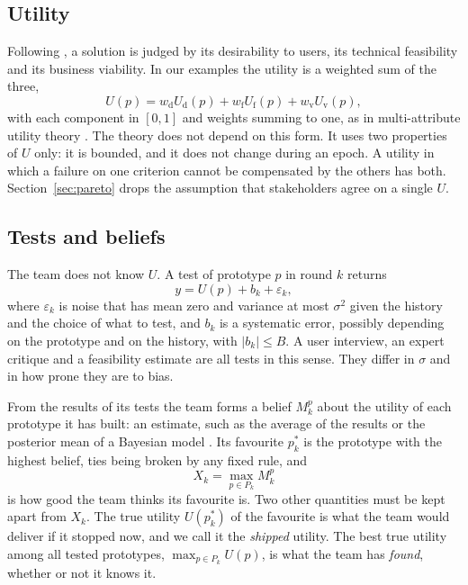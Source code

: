 \documentclass[10pt,twocolumn]{article}
\newcommand{\Pk}{P_k}
\theoremstyle{definition}
\begin{document}
\subsection{Utility}

Following \citet{brown2009}, a solution is judged by its desirability to users, its technical feasibility and its business viability. In our examples the utility is a weighted sum of the three,
\begin{equation}
\label{eq:utility}
U(p)=w_{\mathrm d}U_{\mathrm d}(p)+w_{\mathrm f}U_{\mathrm f}(p)+w_{\mathrm v}U_{\mathrm v}(p),
\end{equation}
with each component in $[0,1]$ and weights summing to one, as in multi-attribute utility theory \citep{keeney1976}. The theory does not depend on this form. It uses two properties of $U$ only: it is bounded, and it does not change during an epoch. A utility in which a failure on one criterion cannot be compensated by the others has both. Section~\ref{sec:pareto} drops the assumption that stakeholders agree on a single $U$.

\subsection{Tests and beliefs}

The team does not know $U$. A test of prototype $p$ in round $k$ returns
\begin{equation}
\label{eq:test}
y=U(p)+b_k+\varepsilon_k ,
\end{equation}
where $\varepsilon_k$ is noise that has mean zero and variance at most $\sigma^2$ given the history and the choice of what to test, and $b_k$ is a systematic error, possibly depending on the prototype and on the history, with $|b_k|\le B$. A user interview, an expert critique and a feasibility estimate are all tests in this sense. They differ in $\sigma$ and in how prone they are to bias.

From the results of its tests the team forms a belief $M^p_k$ about the utility of each prototype it has built: an estimate, such as the average of the results or the posterior mean of a Bayesian model \citep{degroot2004}. Its favourite $p^*_k$ is the prototype with the highest belief, ties being broken by any fixed rule, and
\begin{equation}
\label{eq:Xk}
X_k=\max_{p\in \Pk}M^p_k
\end{equation}
is how good the team thinks its favourite is. Two other quantities must be kept apart from $X_k$. The true utility $U(p^*_k)$ of the favourite is what the team would deliver if it stopped now, and we call it the \emph{shipped} utility. The best true utility among all tested prototypes, $\max_{p\in\Pk}U(p)$, is what the team has \emph{found}, whether or not it knows it.
\end{document}
